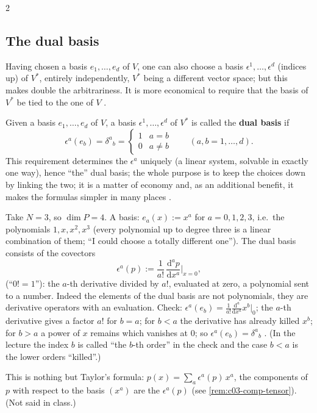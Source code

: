 \begin{paracol}{2}
\subsection{The dual basis}

Having chosen a basis $e_1,\dots,e_d$ of $V$, one can also choose a basis $\epsilon^1,\dots,\epsilon^d$ (indices up) of $V^*$, entirely independently, $V^*$ being a different vector space; but this makes double the arbitrariness. It is more economical to require that the basis of $V^*$ be tied to the one of $V$
.

\begin{definition}\label{def:c03-dualbasis}
Given a basis $e_1,\dots,e_d$ of $V$, a basis $\epsilon^1,\dots,\epsilon^d$ of $V^*$ is called the \textbf{dual basis} if
\[
  \epsilon^a(e_b)=\delta^a{}_b=\begin{cases}1&a=b\\0&a\neq b\end{cases}\qquad(a,b=1,\dots,d).
\]
This requirement determines the $\epsilon^a$ uniquely (a linear system, solvable in exactly one way), hence ``the'' dual basis; the whole purpose is to keep the choices down by linking the two; it is a matter of economy and, as an additional benefit, it makes the formulas simpler in many places
.
\end{definition}

\begin{example}[Dual basis of $P$ for $N=3$]\label{ex:c03-dualbasis}
Take $N=3$, so $\dim P=4$. A basis: $e_a(x):=x^a$ for $a=0,1,2,3$, i.e.\ the polynomials $1,x,x^2,x^3$ (every polynomial up to degree three is a linear combination of them; ``I could choose a totally different one''). The dual basis consists of the covectors
\[
  \epsilon^a(p):=\frac1{a!}\,\frac{\mathrm d^ap}{\mathrm dx^a}\Bigr|_{x=0},
\]
(``$0!=1$''): the $a$-th derivative divided by $a!$, evaluated at zero, a polynomial sent to a number. Indeed the elements of the dual basis are not polynomials, they are derivative operators with an evaluation. Check: $\epsilon^a(e_b)=\frac1{a!}\frac{\mathrm d^a}{\mathrm dx^a}x^b|_0$; the $a$-th derivative gives a factor $a!$ for $b=a$; for $b<a$ the derivative has already killed $x^b$;
for $b>a$ a power of $x$ remains which vanishes at $0$; so $\epsilon^a(e_b)=\delta^a{}_b$ .
(In the lecture the index $b$ is called ``the $b$-th order'' in the check and the case $b<a$ is the lower orders ``killed''.)
\end{example}
\begin{coursenote}[Taylor]
This is nothing but Taylor's formula: $p(x)=\sum_a\epsilon^a(p)\,x^a$, the components of $p$ with respect to the basis $(x^a)$ are the $\epsilon^a(p)$ (see \cref{rem:c03-comp-tensor}). (Not said in class.)
\end{coursenote}


\end{paracol}
